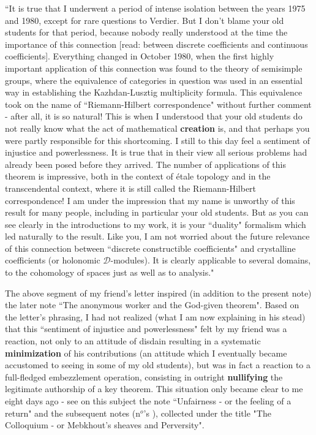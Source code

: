 \begin{adjustwidth}{1cm}{}
``It is true that I underwent a period of intense isolation between the years 1975 and 1980, except for rare questions to Verdier. But I don't blame your old students for that period, because nobody really understood at the time the importance of this connection [read: between discrete coefficients and continuous coefficients]. Everything changed in October 1980, when the first highly important application of this connection was found to the theory of semisimple groups, where the equivalence of categories in question was used in an essential way in establishing the Kazhdan-Lusztig multiplicity formula. This equivalence took on the name of ``Riemann-Hilbert correspondence" without further comment - after all, it is so natural! This is when I understood that your old students do not really know what the act of mathematical \textbf{creation} is, and that perhaps you were partly responsible for this shortcoming. I still to this day feel a sentiment of injustice and powerlessness. It is true that in their view all serious problems had already been posed before they arrived. The number of applications of this theorem is impressive, both in the context of \'etale topology and in the transcendental context, where it is still called the Riemann-Hilbert correspondence! I am under the impression that my name is unworthy of this result for many people, including in particular your old students. But as you can see clearly in the introductions to my work, it is your ``duality" formalism which led naturally to the result. Like you, I am not worried about the future relevance of this connection between ``discrete constructible coefficients" and crystalline coefficients (or holonomic $\mathcal{D}$-modules). It is clearly applicable to several domains, to the cohomology of spaces just as well as to analysis."
\end{adjustwidth}

The above segment of my friend's letter inspired (in addition to the present note) the
later note ``The anonymous worker and the God-given theorem". Based on the letter's
phrasing, I had not realized (what I am now explaining in his stead) that this ``sentiment
of injustice and powerlessness" felt by my friend was a reaction, not only to an attitude
of disdain resulting in a systematic \textbf{minimization} of his contributions (an attitude which I eventually became accustomed to seeing in some of my old students), but was in fact a reaction to a full-fledged
embezzlement operation, consisting in outright \textbf{nullifying} the legitimate authorship of a
key theorem. This situation only became clear to me eight days ago - see on this
subject the note ``Unfairness - or the feeling of a return" and the subsequent notes (n$^o$'s
),
collected under the title "The Colloquium - or Mebkhout's sheaves and Perversity".


